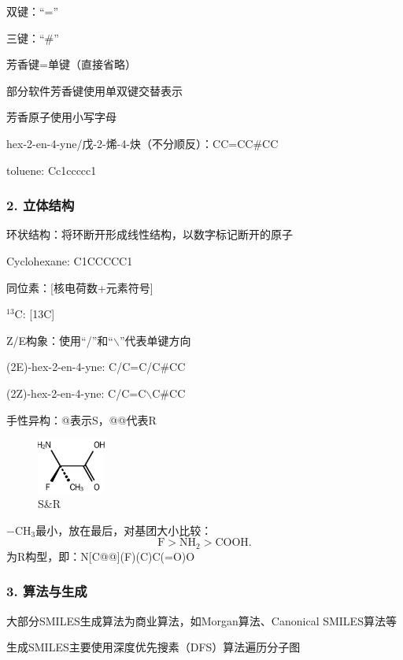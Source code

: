 双键：“=”

三键：“\#”

芳香键=单键（直接省略）
\begin{notation}
    部分软件芳香键使用单双键交替表示

    芳香原子使用小写字母
\end{notation}
\begin{eg}
    hex-2-en-4-yne/戊-2-烯-4-炔（不分顺反）：CC=CC\#CC

    toluene: Cc1ccccc1
\end{eg}
\subsubsection*{2. 立体结构}%
\label{subsub:2-立体结构}
环状结构：将环断开形成线性结构，以数字标记断开的原子
\begin{eg}
    Cyclohexane: C1CCCCC1
\end{eg}
同位素：[核电荷数+元素符号]
\begin{eg}
    $^{13}\text{C}$: [13C]
\end{eg}
Z/E构象：使用“/”和“$\backslash$”代表单键方向
\begin{eg}
    (2E)-hex-2-en-4-yne: C/C=C/C\#CC

    (2Z)-hex-2-en-4-yne: C/C=C$\backslash$C\#CC
\end{eg}
手性异构：@表示S，@@代表R
\begin{eg}
\begin{figure}[htpb]
    \centering
    \includegraphics[width=0.2\textwidth]{figures/S&R}
    \caption{S\&R}
    \label{fig:fig-S-R}
\end{figure}
$-\text{CH}_{3}$最小，放在最后，对基团大小比较：
\[
    \text{F}>\text{NH}_{2}>\text{COOH}
.\] 
为R构型，即：N[C@@](F)(C)C(=O)O
\end{eg}
\subsubsection*{3. 算法与生成}%
\label{subsub:3-算法与生成}
\begin{notation}
    大部分SMILES生成算法为商业算法，如Morgan算法、Canonical SMILES算法等

    生成SMILES主要使用深度优先搜素（DFS）算法遍历分子图
\end{notation}

